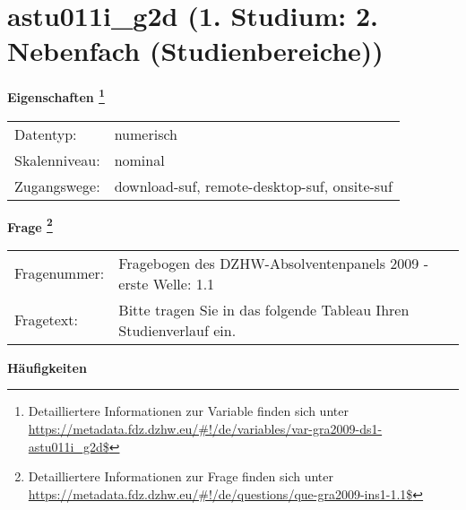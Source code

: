 
    \setcounter{footnote}{0}

    \vspace*{-1.8cm}
	\section{astu011i\_g2d (1. Studium: 2. Nebenfach (Studienbereiche))}
	\label{section:astu011i_g2d}



    \vspace*{0.5cm}
    \noindent\textbf{Eigenschaften
	\footnote{Detailliertere Informationen zur Variable finden sich unter
		\url{https://metadata.fdz.dzhw.eu/\#!/de/variables/var-gra2009-ds1-astu011i_g2d$}}}\\
	\begin{tabularx}{\hsize}{@{}lX}
	Datentyp: & numerisch \\
	Skalenniveau: & nominal \\
	Zugangswege: &
	  download-suf, 
	  remote-desktop-suf, 
	  onsite-suf
 \\
    \end{tabularx}



				\vspace*{0.5cm}
                \noindent\textbf{Frage
	                \footnote{Detailliertere Informationen zur Frage finden sich unter
		              \url{https://metadata.fdz.dzhw.eu/\#!/de/questions/que-gra2009-ins1-1.1$}}}\\
				\begin{tabularx}{\hsize}{@{}lX}
					Fragenummer: &
					  Fragebogen des DZHW-Absolventenpanels 2009 - erste Welle:
					  1.1
 \\
					Fragetext: & Bitte tragen Sie in das folgende Tableau Ihren Studienverlauf ein. \\
				\end{tabularx}





        		\vspace*{0.5cm}
                \noindent\textbf{Häufigkeiten}

